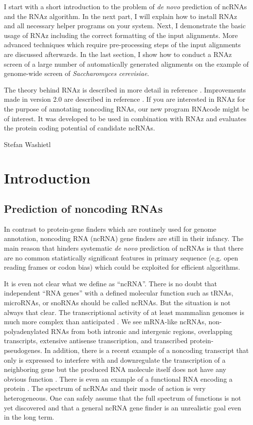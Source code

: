 \documentclass[11pt]{article}
\begin{document}
I start with a short introduction to the problem of \emph{de novo}
prediction of ncRNAs and the RNAz algorithm. In the next part, I will
explain how to install RNAz and all necessary helper programs on your
system. Next, I demonstrate the basic usage of RNAz including the
correct formatting of the input alignments. More advanced techniques
which require pre-processing steps of the input alignments are
discussed afterwards. In the last section, I show how to conduct a
RNAz screen of a large number of automatically generated alignments on
the example of genome-wide screen of \emph{Saccharomyces cerevisiae}.

The theory behind RNAz is described in more detail in reference
\cite{washietl05a}. Improvements made in version 2.0 are described in
reference \cite{Gruber:2010}. If you are interested in RNAz for the
purpose of annotating noncoding RNAs, our new program RNAcode
\cite{Findeiss:2011} might be of interest. It was developed to be used
in combination with RNAz and evaluates the protein coding potential of
candidate ncRNAs.

\hfill Stefan Washietl


\newpage


\section{Introduction}

\subsection{Prediction of noncoding RNAs}

In contrast to protein-gene finders which are routinely used for genome
annotation, noncoding RNA (ncRNA) gene finders are still in their infancy.
The main reason that hinders systematic \emph{de novo} prediction of ncRNAs
is that there are no common statistically significant features in primary
sequence (e.g. open reading frames or codon bias) which could be exploited
for efficient algorithms.

It is even not clear what we define as ``ncRNA''. There is no doubt that
independent ``RNA genes'' with a defined molecular function such as tRNAs,
microRNAs, or snoRNAs should be called ncRNAs. But the situation is not
always that clear. The transcriptional activity of at least mammalian
genomes is much more complex than anticipated \cite{frith05}. We see
mRNA-like ncRNAs, non-polyadenylated RNAs from both intronic and intergenic
regions, overlapping transcripts, extensive antisense transcription, and
transcribed protein-pseudogenes. In addition, there is a recent example of
a noncoding transcript that only is expressed to interfere with and
downregulate the transcription of a neighboring gene but the produced RNA
molecule itself does not have any obvious function \cite{martens04}. There
is even an example of a functional RNA encoding a protein
\cite{chooniedass-ko04}. The spectrum of ncRNAs and their mode of action is
very heterogeneous. One can safely assume that the full spectrum of
functions is not yet discovered and that a general ncRNA gene finder is an
unrealistic goal even in the long term.
\end{document}
